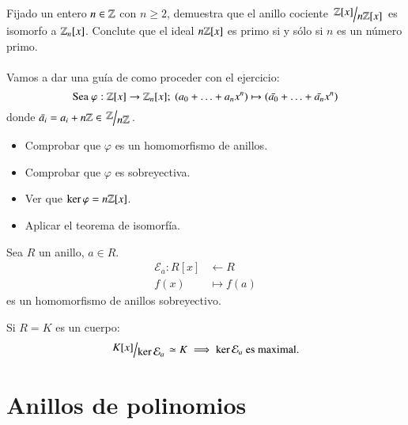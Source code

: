 \begin{ex}[H1.21]
    Fijado un entero $n \in \mathbb{Z}$ con $n \geq 2$, demuestra que el anillo cociente $\quo{\Z[x]}{n\Z[x]}$ es isomorfo a $\mathbb{Z}_n[x]$. Conclute que el ideal $n\mathbb{Z}[x]$ es primo si y sólo si $n$ es un número primo.\\\\
    Vamos a dar una guía de como proceder con el ejercicio:
    $$
        \text{Sea } \varphi: \mathbb{Z}[x] \to \mathbb{Z}_n[x];\ (a_0 + \ldots + a_n x^n) \mapsto (\bar{a_0} + \ldots + \bar{a_n} x^n)
    $$
    donde $\bar{a_i} = a_i + n\Z \in \quo{\Z}{n\Z}$.
    \begin{itemize}
        \item Comprobar que $\varphi$ es un homomorfismo de anillos.
        \item Comprobar que $\varphi$ es sobreyectiva.
        \item Ver que $\ker \varphi = n\mathbb{Z}[x]$.
        \item Aplicar el teorema de isomorfía.
    \end{itemize}
\end{ex}

\begin{eg}
    Sea $R$ un anillo, $a \in R$.
    \begin{align*}
        \mathcal{E}_a : R[x] &\longleftarrow R\\
                     f(x) &\longmapsto f(a)
    \end{align*}
    es un homomorfismo de anillos sobreyectivo.
\end{eg}

\begin{obs}
    Si $R = K$ es un cuerpo:
    $$
        \quo{K[x]}{\ker \mathcal{E}_a} \isom K \implies \ker\mathcal{E}_a \text{ es maximal.}
    $$
\end{obs}

\section{Anillos de polinomios}

